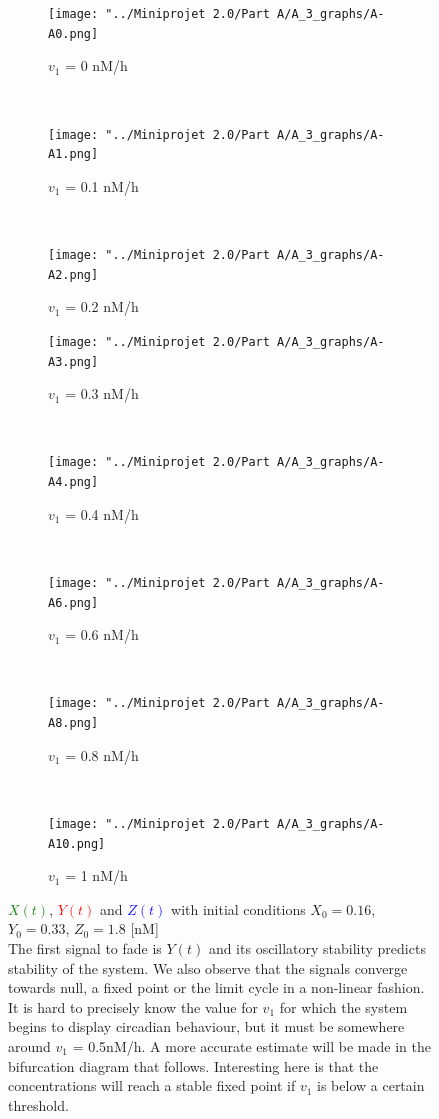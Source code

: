 \documentclass[10pt,a4paper,oneside,twocolumn]{article}
\newcommand{\red}[1]{\textcolor{red}{#1}}
\newcommand{\blue}[1]{\textcolor{blue}{#1}}
\newcommand{\green}[1]{\textcolor{green}{#1}}
\numberwithin{equation}{section} %
\begin{document}
    \begin{figure}
    \centering
	\begin{subfigure}[b]{0.3\textwidth}
	    \texttt{[image: "../Miniprojet 2.0/Part A/A\_3\_graphs/A-A0.png]}
	    \caption{$v_1$ = 0 nM/h}
	    \end{subfigure}
	    ~ 
	    \begin{subfigure}[b]{0.3\textwidth}
	    \texttt{[image: "../Miniprojet 2.0/Part A/A\_3\_graphs/A-A1.png]}
	    \caption{$v_1$ = 0.1 nM/h}
	    \end{subfigure}
	    ~ 
	\begin{subfigure}[b]{0.3\textwidth}
	    \texttt{[image: "../Miniprojet 2.0/Part A/A\_3\_graphs/A-A2.png]}
	    \caption{$v_1$ = 0.2 nM/h}
	\end{subfigure}
	 
	\begin{subfigure}[b]{0.3\textwidth}
	    \texttt{[image: "../Miniprojet 2.0/Part A/A\_3\_graphs/A-A3.png]}
	    \caption{$v_1$ = 0.3 nM/h}
	\end{subfigure}
	~ 
	\begin{subfigure}[b]{0.3\textwidth}
	    \texttt{[image: "../Miniprojet 2.0/Part A/A\_3\_graphs/A-A4.png]}
	    \caption{$v_1$ = 0.4 nM/h}
	\end{subfigure}
	~
	\begin{subfigure}[b]{0.3\textwidth}
	    \texttt{[image: "../Miniprojet 2.0/Part A/A\_3\_graphs/A-A6.png]}
	    \caption{$v_1$ = 0.6 nM/h}
	\end{subfigure}
	~ 
	\begin{subfigure}[b]{0.3\textwidth}
	    \texttt{[image: "../Miniprojet 2.0/Part A/A\_3\_graphs/A-A8.png]}
	    \caption{$v_1$ = 0.8 nM/h}
	\end{subfigure}
	~
	\begin{subfigure}[b]{0.3\textwidth}
	    \texttt{[image: "../Miniprojet 2.0/Part A/A\_3\_graphs/A-A10.png]}
	    \caption{$v_1$ = 1 nM/h}
	\end{subfigure}

	\caption{\green{$X(t)$}, \red{$Y(t)$} and \blue{$Z(t)$} with initial conditions $X_0 = 0.16$, $Y_0 = 0.33 $, $Z_0 = 1.8$ [nM]\\
	The first signal to fade is $Y(t)$ and its oscillatory stability predicts stability of the system. We also observe that the signals converge towards null, a fixed point or the limit cycle in a non-linear fashion. It is hard to precisely know the value for $v_1$ for which the system begins to display circadian behaviour, but it must be somewhere around $v_1$ = 0.5nM/h. A more accurate estimate will be made in the bifurcation diagram that follows. Interesting here is that the concentrations will reach a stable fixed point if $v_1$ is below a certain threshold. }
    \end{figure}
\end{document}

